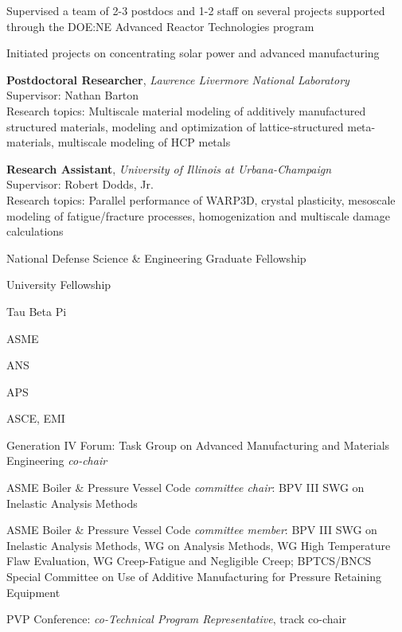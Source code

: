 Supervised a team of 2-3 postdocs and 1-2 staff on several projects
supported through the DOE:NE Advanced Reactor Technologies program

Initiated projects on concentrating solar power and advanced manufacturing

\textbf{Postdoctoral Researcher}, \emph{Lawrence Livermore National
Laboratory} \\
Supervisor: Nathan Barton \\
Research topics: Multiscale material modeling of additively manufactured
structured materials, modeling and optimization of lattice-structured
meta-materials, multiscale modeling of HCP metals

\textbf{Research Assistant}, \emph{University of Illinois at Urbana-Champaign}
\\
Supervisor: Robert Dodds, Jr. \\
Research topics: Parallel performance of WARP3D, crystal plasticity,
mesoscale modeling of fatigue/fracture processes, homogenization and
multiscale damage calculations


National Defense Science \& Engineering Graduate Fellowship 

University Fellowship 

Tau Beta Pi 


ASME 

ANS 

APS 

ASCE, EMI 


Generation IV Forum:  Task Group on Advanced Manufacturing and Materials Engineering \emph{co-chair} 

ASME Boiler \& Pressure Vessel Code \emph{committee chair}:  BPV III SWG on Inelastic Analysis Methods 

ASME Boiler \& Pressure Vessel Code \emph{committee member}:  BPV III SWG on Inelastic Analysis
Methods, WG on Analysis Methods, WG High Temperature Flaw Evaluation, 
WG Creep-Fatigue and Negligible Creep; BPTCS/BNCS Special Committee on 
Use of Additive Manufacturing for Pressure Retaining Equipment 

PVP Conference:  \emph{co-Technical Program Representative}, track co-chair


